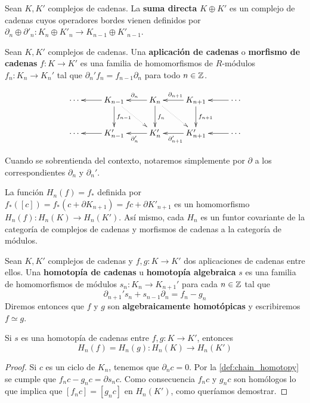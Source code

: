 \begin{definicion}
	Sean $K,K'$ complejos de cadenas. La \textbf{suma directa} \( K \oplus K' \) es un complejo de cadenas cuyos operadores bordes vienen definidos por $\partial_n \oplus \partial'_n : K_{n} \oplus K'_{n} \to K_{n-1} \oplus K'_{n-1}$.
\end{definicion}

\begin{definicion}
	Sean $K,K'$ complejos de cadenas. Una \textbf{aplicación de cadenas} o \textbf{morfismo de cadenas} $f: K \rightarrow K'$ es una familia de homomorfismos de $R$-módulos $f_n: K_n \rightarrow K_n'$ tal que $\partial_n'f_n = f_{n-1}\partial_n$ para todo $n \in \mathbb{Z}$.
\end{definicion}

\begin{equation}
	\label{chaincomplex}
	\xymatrix{
		\cdots & K_{n-1} \ar[l] \ar[d]^{f_{n-1}} \ar@{..>}[dr] & K_n \ar[l]_{\partial_{n}} \ar[d]^{f_n} \ar@{..>}[dr] & K_{n+1} \ar[l]_{\partial_{n+1}} \ar[d]^{f_{n+1}} & \cdots \ar[l] \\
		\cdots & K'_{n-1} \ar[l] & K'_n \ar[l]^{\partial'_{n}} & K'_{n+1} \ar[l]^{\partial'_{n+1}} & \cdots \ar[l]
    }
\end{equation}

Cuando se sobrentienda del contexto, notaremos simplemente por $\partial$ a los correspondientes $\partial_n$ y $\partial_n'$.

La función $H_n(f) = f_*$ definida por $f_*([c]) = f_*(c + \partial K_{n+1}) = fc + \partial K'_{n+1}$ es un homomorfismo $H_n(f): H_n(K) \rightarrow H_n(K')$. Así mismo, cada $H_n$ es un funtor covariante de la categoría de complejos de cadenas y morfismos de cadenas a la categoría de módulos.

\begin{definicion}
	\label{def:chain_homotopy}
	Sean $K,K'$ complejos de cadenas y $f,g: K \rightarrow K'$ dos aplicaciones de cadenas entre ellos. Una \textbf{homotopía de cadenas} u \textbf{homotopía algebraica} $s$ es una familia de homomorfismos de módulos $s_n: K_n \rightarrow K_{n+1}'$ para cada $n \in \mathbb{Z}$ tal que
	\begin{equation}
		\partial_{n+1}'s_n + s_{n-1} \partial_n = f_n - g_n
	\end{equation}
	Diremos entonces que $f$ y $g$ son \textbf{algebraicamente homotópicas} y escribiremos $f \simeq g$.
\end{definicion}

\begin{teorema}
	Si $s$ es una homotopía de cadenas entre $f,g: K \rightarrow K'$, entonces
	\[ H_n(f) = H_n(g) : H_n(K) \rightarrow H_n(K') \]
\end{teorema}
\begin{proof}
	Si $c$ es un ciclo de $K_n$, tenemos que $\partial_n c = 0$. Por la \autoref{def:chain_homotopy} se cumple que $f_nc-g_nc =  \partial s_n c$. Como consecuencia $f_n c$ y $g_n c$ son homólogos lo que implica que $[f_n c] = [g_n c]$ en $H_n(K')$, como queríamos demostrar.
\end{proof}

